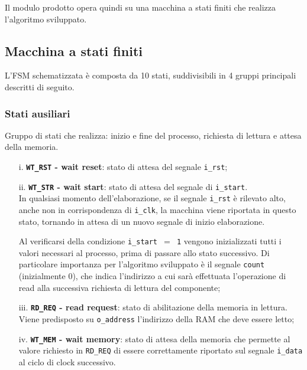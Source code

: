 \documentclass{article}
\begin{document}
Il modulo prodotto opera quindi su una macchina a stati finiti che realizza l'algoritmo sviluppato.
\vspace{0,2cm}

\subsection{Macchina a stati finiti} %
L’FSM schematizzata è composta da 10 stati, suddivisibili in 4 gruppi principali descritti di seguito.

\subsubsection{Stati ausiliari} %
Gruppo di stati che realizza: inizio e fine del processo, richiesta di lettura e attesa della memoria.
\begin{itemize}
    \item [i.]      \textbf{\texttt{WT\_RST} - wait reset}: stato di attesa del segnale \texttt{i\_rst};
    \item [ii.]     \textbf{\texttt{WT\_STR} - wait start}: stato di attesa del segnale di \texttt{i\_start}. \\
          In qualsiasi momento dell’elaborazione, se il segnale \texttt{i\_rst} è rilevato alto\footnotemark, anche non in corrispondenza di \texttt{i\_clk}, la macchina viene riportata in questo stato, tornando in attesa di un nuovo segnale di inizio elaborazione.\par
          Al verificarsi della condizione \texttt{i\_start $=$ 1} vengono inizializzati tutti i valori necessari al processo, prima di passare allo stato successivo. Di particolare importanza per l’algoritmo sviluppato è il segnale \texttt{count} (inizialmente 0), che indica l’indirizzo a cui sarà effettuata l’operazione di read alla successiva richiesta di lettura del componente;
    \item [iii.]    \textbf{\texttt{RD\_REQ} - read request}: stato di abilitazione della memoria in lettura. Viene predisposto su \texttt{o\_address} l’indirizzo della RAM che deve essere letto;
    \item [iv.]     \textbf{\texttt{WT\_MEM} - wait memory}: stato di attesa della memoria che permette al valore richiesto in \texttt{RD\_REQ} di essere correttamente riportato sul segnale \texttt{i\_data} al ciclo di clock successivo. \par

\end{itemize}
\end{document}
